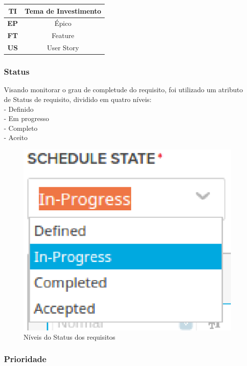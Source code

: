 \begin{tabular}{|c|c|}
  \hline
  \textbf{TI} & Tema de Investimento \\ \hline
  \textbf{EP} & Épico \\ \hline
  \textbf{FT} & Feature \\ \hline
  \textbf{US} & User Story \\ \hline
\end{tabular}

\subsubsection{Status}
Visando monitorar o grau de completude do requisito, foi utilizado um atributo de Status de requisito, dividido em quatro níveis: \\
\tab - Definido\\
\tab - Em progresso\\
\tab - Completo\\
\tab - Aceito\\

\begin{figure}[h]
    \centering
    \label{fig01}
        \includegraphics[keepaspectratio=true,scale=1]{figuras/RallyDev/status.eps}
    \caption{Níveis do Status dos requisitos}
\end{figure}

\subsubsection{Prioridade}

